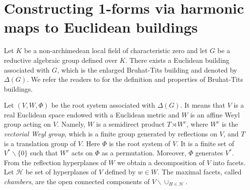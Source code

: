 \documentclass[11pt,a4paper,english]{smfart}
\theoremstyle{plain}
\newtheorem{theorem}{Theorem}[section]
\theoremstyle{definition}
\newtheorem{definition}[theorem]{Definition}
\theoremstyle{plain}
\def\cH{\mathcal{H}}
\begin{document}
	
	
	
	
	
	\section{Constructing  1-forms via harmonic maps to Euclidean buildings}\label{sec:1-form}  
	Let $K$ be a non-archimedean local field of characteristic zero and let $G$ be a reductive algebraic group defined over $K$. There exists a Euclidean building associated with $G$, which is  the enlarged Bruhat-Tits building and denoted by $\Delta(G)$.  We refer the readers to \cite{KP23,Rou23} for the definition and properties of Bruhat-Tits buildings. 
	
	
	
	Let $(V,W,\Phi)$ be the root system associated with $\Delta(G)$. It means that $V$ is a real Euclidean space endowed with a Euclidean metric and $W$ is an affine Weyl group acting on $V$. Namely, $W$ is a semidirect product   $T\rtimes W^v$,  where $W^v$ is the \emph{vectorial Weyl group}, which is a finite group generated by reflections on $V$, and $T$ is a translation group of $V$.  Here $\Phi$ is the root system of $V$.  It is a finite set of $V^*\backslash \{0\}$ such that $W^v$ acts on $\Phi$ as a permutation.  Moreover, $\Phi$ generates $V^*$.  From the reflection hyperplanes of $W$ we obtain a decomposition of $V$ into facets. Let $\cH$ be set of  hyperplanes of $V$ defined by $w\in W$.  The maximal facets, called \emph{chambers}, are the open connected components of $V\backslash \cup_{H\in \cH}$. 
	
\end{document}

